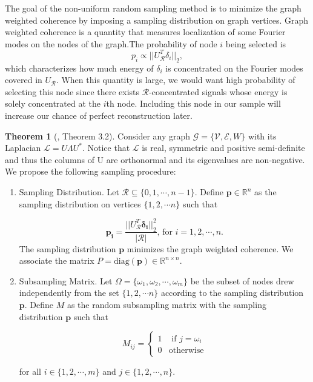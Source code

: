 \documentclass[a4paper]{article}
\newcommand{\R}{\mathcal{R}}
\newcommand{\RR}{\mathbb{R}}
\newcommand{\G}{\mathcal{G}}
\newcommand{\V}{\mathcal{V}}
\newcommand{\E}{\mathcal{E}}
\renewcommand{\L}{\boldsymbol{\mathcal{L}}}
\theoremstyle{definition}
\newtheorem*{thm}{Theorem}
\begin{document}
The goal of the non-uniform random sampling method is to minimize the graph weighted coherence by imposing a sampling distribution on graph vertices. Graph weighted coherence is a quantity that measures localization of some Fourier modes on the nodes of the graph.The probability of node $i$ being selected is $$p_i\propto ||U_{\R}^T\delta_i||_2,$$ which characterizes how much energy of $\delta_i$ is concentrated on the Fourier modes covered in $U_{\R}$. When this quantity is large, we would want high probability of selecting this node since there exists $\R$-concentrated signals whose energy is solely concentrated at the $i$th node. Including this node in our sample will increase our chance of perfect reconstruction later.

\begin{thm}[\cite{puy}, Theorem 3.2]
Consider any graph $\G = \{\V, \E, W\}$ with its Laplacian $\L = U\Lambda U^*$. Notice that $\L$ is real, symmetric and positive semi-definite and thus the columns of U are orthonormal and its eigenvalues are non-negative. We propose the following sampling procedure:

\begin{enumerate}

\item Sampling Distribution. Let $\R \subseteq \{0,1,\cdots, n-1\}$. Define $\bm{p} \in \RR^n$ as the sampling distribution on vertices $\{1,2, \cdots n\}$  such that 

\[\bm{p_i} = \frac{||U^T_\R\bm{\delta_i}||^2_2}{|\R|} \text{, for } i = 1,2 ,\cdots, n. \tag{1}\]  
The sampling distribution $\bm{p}$ minimizes the graph weighted coherence. We associate the matrix $P = \text{diag}(\bm{p}) \in \RR^{n\times n}$.

\item Subsampling Matrix. Let $\Omega = \{\omega_1, \omega_2, \cdots, \omega_m\}$ be the subset of nodes drew independently from the set $\{1,2,\cdots n\}$ according to the sampling distribution $\bm{p}$. Define $M$ as the random subsampling matrix with the sampling distribution $\bm{p}$ such that

\[M_{ij} = 
\begin{cases} 
      1 & \text{ if } j = \omega_{i}\\
      0 & \text{otherwise}
   \end{cases}
\tag{2}\] 

for all $i \in \{1,2,\cdots,m\}$ and $j \in \{1,2,\cdots, n\}$.

\end{enumerate}


\end{thm}
\end{document}
